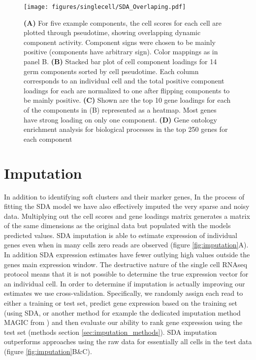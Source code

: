 \begin{figure}[H]
	\centering
	\texttt{[image: figures/singlecell/SDA\_Overlaping.pdf]}
	\caption[Overlapping SDA Components]{
		\textbf{(A)} For five example components, the cell scores for each cell are plotted through pseudotime, showing overlapping dynamic component activity. Component signs were chosen to be mainly positive (components have arbitrary sign). Color mappings as in panel B.
		\textbf{(B)} Stacked bar plot of cell component loadings for 14 germ components sorted by cell pseudotime. Each column corresponds to an individual cell and the total positive component loadings for each are normalized to one after flipping components to be mainly positive.
		\textbf{(C)} Shown are the top 10 gene loadings for each of the components in (B) represented as a heatmap. Most genes have strong loading on only one component.
		\textbf{(D)} Gene ontology enrichment analysis for biological processes in the top 250 genes for each component }
	\label{fig:SDA_overlapping}
\end{figure}



\section{Imputation}

In addition to identifying soft clusters and their marker genes, In the process of fitting the SDA model we have also effectively imputed the very sparse and noisy data. Multiplying out the cell scores and gene loadings matrix generates a matrix of the same dimensions as the original data but populated with the models predicted values. SDA imputation is able to estimate expression of individual genes even when in many cells zero reads are observed (figure \ref{fig:imputation}A). In addition SDA expression estimates have fewer outlying high values outside the genes main expression window. The destructive nature of the single cell RNAseq protocol means that it is not possible to determine the true expression vector for an individual cell. In order to determine if imputation is actually improving our estimates we use cross-validation. Specifically, we randomly assign each read to either a training or test set, predict gene expression based on the training set (using SDA, or another method for example the dedicated imputation method MAGIC from \cite{vanDijk2018Recovering}) and then evaluate our ability to rank gene expression using the test set (methods section \ref{sec:imputation_methods}). SDA imputation outperforms approaches using the raw data for essentially all cells in the test data (figure \ref{fig:imputation}B\&C).

